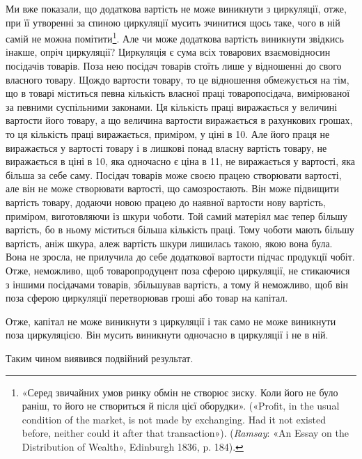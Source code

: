 
Ми вже показали, що додаткова вартість не може виникнути
з циркуляції, отже, при її утворенні за спиною циркуляції мусить
зчинитися щось таке, чого в ній самій не можна помітити\footnote{
«Серед звичайних умов ринку обмін не створює зиску. Коли його
не було раніш, то його не створиться й після цієї оборудки». («Profit, in
the usual condition of the market, is not made by exchanging. Had it not
existed before, neither could it after that transaction»). (\emph{Ramsay}: «An
Essay on the Distribution of Wealth», Edinburgh 1836, p. 184).
}. Але
чи може додаткова вартість виникнути звідкись інакше, опріч
циркуляції? Циркуляція є сума всіх товарових взаємовідносин
посідачів товарів. Поза нею посідач товарів стоїть лише у відношенні
до свого власного товару. Щождо вартости товару, то це
відношення обмежується на тім, що в товарі міститься певна
кількість власної праці товаропосідача, вимірюваної за певними
суспільними законами. Ця кількість праці виражається у величині
вартости його товару, а що величина вартости виражається
в рахункових грошах, то ця кількість праці виражається, приміром,
у ціні в 10. Але його праця не виражається
у вартості товару і в лишкові понад власну вартість товару,
не виражається в ціні в 10, яка одночасно є ціна в 11, не виражається
у вартості, яка більша за себе саму. Посідач товарів
може своєю працею створювати вартості, але він не може створювати
вартості, що самозростають. Він може підвищити вартість
товару, додаючи новою працею до наявної вартости нову вартість,
приміром, виготовляючи із шкури чоботи. Той самий матеріял
має тепер більшу вартість, бо в ньому міститься більша кількість
праці. Тому чоботи мають більшу вартість, аніж шкура, алеж вартість
шкури лишилась такою, якою вона була. Вона не зросла,
не прилучила до себе додаткової вартости підчас продукції чобіт.
Отже, неможливо, щоб товаропродуцент поза сферою циркуляції,
не стикаючися з іншими посідачами товарів, збільшував вартість,
а тому й неможливо, щоб він поза сферою циркуляції перетворював
гроші або товар на капітал.

Отже, капітал не може виникнути з циркуляції і так само не
може виникнути поза циркуляцією. Він мусить виникнути одночасно
в циркуляції і не в ній.

Таким чином виявився подвійний результат.

